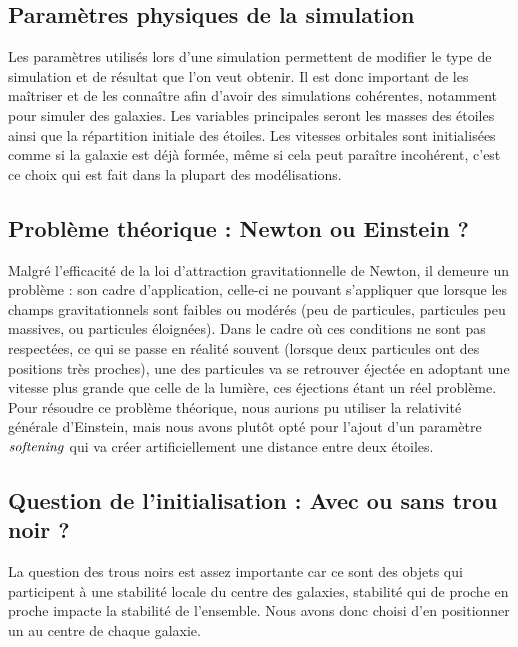 \vspace{3mm}
\subsection{Paramètres physiques de la simulation}
\vspace{2mm}

Les paramètres utilisés lors d'une simulation permettent de modifier le type de simulation et de résultat que l'on veut obtenir. Il est donc important de les maîtriser et de les connaître afin d'avoir des simulations cohérentes, notamment pour simuler des galaxies. Les variables principales seront les masses des étoiles ainsi que la répartition initiale des étoiles. Les vitesses orbitales sont initialisées comme si la galaxie est déjà formée, même si cela peut paraître incohérent, c'est ce choix qui est fait dans la plupart des modélisations.

\vspace{3mm}
\subsection{Problème théorique : Newton ou Einstein ?}
\vspace{2mm}

Malgré l'efficacité de la loi d'attraction gravitationnelle de Newton, il demeure un problème : son cadre d'application, celle-ci ne pouvant s'appliquer que lorsque les champs gravitationnels sont faibles ou modérés (peu de particules, particules peu massives, ou particules éloignées). Dans le cadre où ces conditions ne sont pas respectées, ce qui se passe en réalité souvent (lorsque deux particules ont des positions très proches), une des particules va se retrouver éjectée en adoptant une vitesse plus grande que celle de la lumière, ces éjections étant un réel problème. Pour résoudre ce problème théorique, nous aurions pu utiliser la relativité générale d'Einstein, mais nous avons plutôt opté pour l'ajout d'un paramètre $\it{softening}$ qui va créer artificiellement une distance entre deux étoiles.

\vspace{3mm}
\subsection{Question de l'initialisation : Avec ou sans trou noir ?}
\vspace{2mm}

La question des trous noirs est assez importante car ce sont des objets qui participent à une stabilité locale du centre des galaxies, stabilité qui de proche en proche impacte la stabilité de l'ensemble. Nous avons donc choisi d'en positionner un au centre de chaque galaxie.

